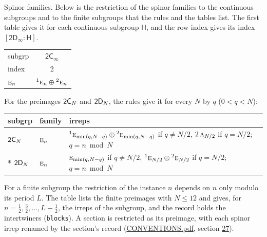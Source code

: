 \documentclass[10pt,a4paper]{article}
\makeatletter
\renewcommand\paragraph{\@startsection{paragraph}{4}{\z@}{1.5ex plus .5ex minus .2ex}{-1em}%
  {\normalfont\small\sffamily\bfseries\color{parttitle}}}
\numberwithin{equation}{section}
\newcommand{\grp}[1]{\mathsf{#1}}
\newcommand{\irr}[1]{\text{\normalfont\scshape #1}}
\newcommand{\conjpair}[1]{{}^{#1}}
\newcommand{\grpindex}[2]{[#1 : #2]}
\newcommand{\period}{L}
\makeatother
\begin{document}
\paragraph{Spinor families.} Below is the restriction of the spinor families to the continuous subgroups and to the finite subgroups that the rules and the tables list. The first table gives it for each continuous subgroup $\grp{H}$, and the row index gives its index $\grpindex{\grp{2D_{\infty }}}{\grp{H}}$.
{\small\begin{longtable}{@{}lc@{}}\toprule
subgrp & \href{2Cinf.pdf}{$\grp{2C_{\infty }}$}\\
index & 2\\\midrule\endhead
\bottomrule\endfoot\endlastfoot
$\irr{e}_{n}$ & $\conjpair{1}\irr{e}_{n}\oplus \conjpair{2}\irr{e}_{n}$\\
\bottomrule\end{longtable}}
\leavevmode\label{n:index.residue}For the preimages $\grp{2C_{\mathnormal{N}}}$ and $\grp{2D_{\mathnormal{N}}}$, the rules give it for every $N$ by $q$ ($0 < q < N$):
{\small\begin{longtable}{@{}ll>{\RaggedRight\arraybackslash}p{}@{}}\toprule
subgrp & family & irreps\\\midrule\endhead
\bottomrule\endfoot\endlastfoot
$\grp{2C_{\mathnormal{N}}}$ & $\irr{e}_{n}$ & $\conjpair{1}\irr{e}_{\min(q,N-q)}\oplus \conjpair{2}\irr{e}_{\min(q,N-q)}$ if $q \ne N/2$, $2\,\irr{a}_{N/2}$ if $q = N/2$; $q = n \bmod N$\\*
$\grp{2D_{\mathnormal{N}}}$ & $\irr{e}_{n}$ & $\irr{e}_{\min(q,N-q)}$ if $q \ne N/2$, $\conjpair{1}\irr{e}_{N/2}\oplus \conjpair{2}\irr{e}_{N/2}$ if $q = N/2$; $q = n \bmod N$\\
\bottomrule\end{longtable}}
\leavevmode\label{n:index.period}For a finite subgroup the restriction of the instance $n$ depends on $n$ only modulo its period $\period$. The table lists the finite preimages with $N \le 12$ and gives, for $n = \tfrac{1}{2}, \tfrac{3}{2}, \dots, \period - \tfrac{1}{2}$, the irreps of the subgroup, and the record holds the intertwiners (\texttt{blocks}). A section is restricted as its preimage, with each spinor irrep renamed by the section's record (\href{../../CONVENTIONS.pdf}{CONVENTIONS.pdf}, section \href{../../CONVENTIONS.pdf\#conv.27}{27}).
\end{document}
